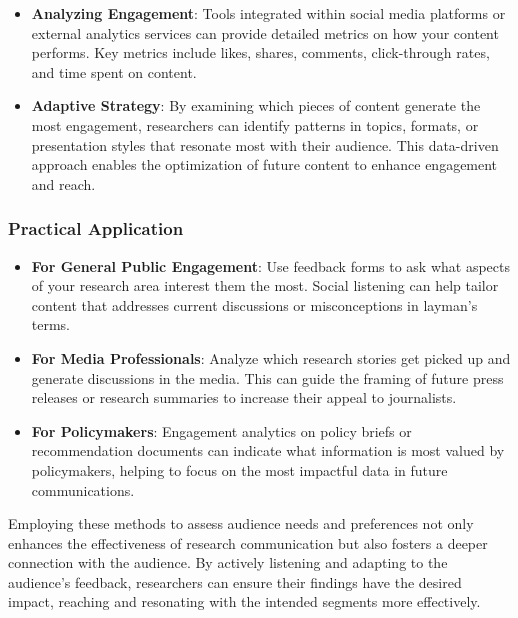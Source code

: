 \documentclass[
]{book}
\providecommand{\tightlist}{%
  \setlength{\itemsep}{0pt}\setlength{\parskip}{0pt}}
\begin{document}
\begin{itemize}
\tightlist
\item
  \textbf{Analyzing Engagement}: Tools integrated within social media platforms or external analytics services can provide detailed metrics on how your content performs. Key metrics include likes, shares, comments, click-through rates, and time spent on content.
\item
  \textbf{Adaptive Strategy}: By examining which pieces of content generate the most engagement, researchers can identify patterns in topics, formats, or presentation styles that resonate most with their audience. This data-driven approach enables the optimization of future content to enhance engagement and reach.
\end{itemize}

\hypertarget{practical-application}{%
\subsubsection*{Practical Application}\label{practical-application}}

\begin{itemize}
\tightlist
\item
  \textbf{For General Public Engagement}: Use feedback forms to ask what aspects of your research area interest them the most. Social listening can help tailor content that addresses current discussions or misconceptions in layman's terms.
\item
  \textbf{For Media Professionals}: Analyze which research stories get picked up and generate discussions in the media. This can guide the framing of future press releases or research summaries to increase their appeal to journalists.
\item
  \textbf{For Policymakers}: Engagement analytics on policy briefs or recommendation documents can indicate what information is most valued by policymakers, helping to focus on the most impactful data in future communications.
\end{itemize}

Employing these methods to assess audience needs and preferences not only enhances the effectiveness of research communication but also fosters a deeper connection with the audience. By actively listening and adapting to the audience's feedback, researchers can ensure their findings have the desired impact, reaching and resonating with the intended segments more effectively.
\end{document}
